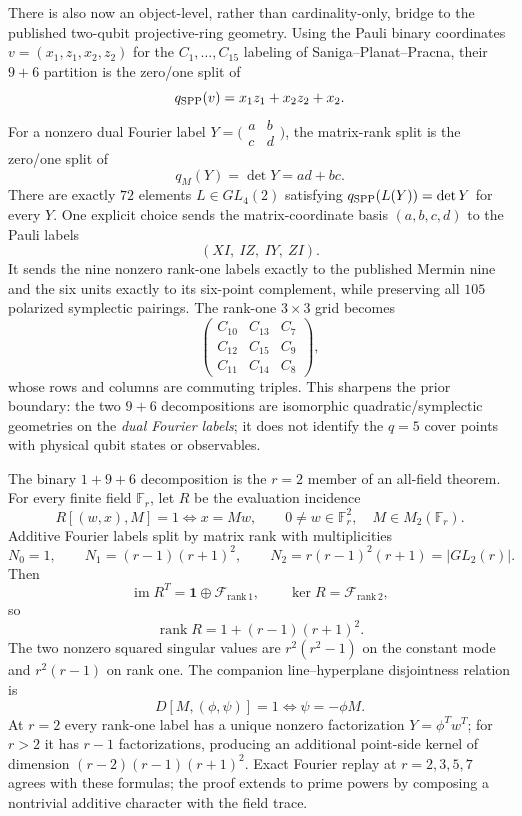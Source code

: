 There is also now an object-level, rather than cardinality-only, bridge to the
published two-qubit projective-ring geometry.  Using the Pauli binary coordinates
$v=(x_1,z_1,x_2,z_2)$ for the $C_1,\ldots,C_{15}$ labeling of
Saniga--Planat--Pracna, their $9+6$ partition is the zero/one split of
\[
q_{\rm SPP}(v)=x_1z_1+x_2z_2+x_2.
\]
For a nonzero dual Fourier label
$Y=\bigl(\begin{smallmatrix}a&b\\c&d\end{smallmatrix}\bigr)$, the matrix-rank
split is the zero/one split of
\[
q_M(Y)=\det Y=ad+bc.
\]
There are exactly $72$ elements $L\in GL_4(2)$ satisfying
$q_{\rm SPP}(L(Y))=\det Y$ for every $Y$.  One explicit choice sends the
matrix-coordinate basis $(a,b,c,d)$ to the Pauli labels
\[
(XI,\ IZ,\ IY,\ ZI).
\]
It sends the nine nonzero rank-one labels exactly to the published Mermin
nine and the six units exactly to its six-point complement, while preserving
all $105$ polarized symplectic pairings.  The rank-one $3\times3$ grid becomes
\[
\begin{pmatrix}
C_{10}&C_{13}&C_7\\
C_{12}&C_{15}&C_9\\
C_{11}&C_{14}&C_8
\end{pmatrix},
\]
whose rows and columns are commuting triples.  This sharpens the prior boundary:
the two $9+6$ decompositions are isomorphic quadratic/symplectic geometries on
the \emph{dual Fourier labels}; it does not identify the $q=5$ cover points with
physical qubit states or observables.

The binary $1+9+6$ decomposition is the $r=2$ member of an all-field theorem.
For every finite field $\mathbb F_r$, let $R$ be the evaluation incidence
\[
R[(w,x),M]=1\iff x=Mw,
\qquad 0\ne w\in\mathbb F_r^2,\quad M\in M_2(\mathbb F_r).
\]
Additive Fourier labels split by matrix rank with multiplicities
\[
N_0=1,\qquad N_1=(r-1)(r+1)^2,\qquad
N_2=r(r-1)^2(r+1)=|GL_2(r)|.
\]
Then
\[
\boxed{\operatorname{im}R^T=\mathbf 1\oplus\mathcal F_{\mathrm{rank}\,1}},
\qquad
\boxed{\ker R=\mathcal F_{\mathrm{rank}\,2}},
\]
so
\[
\boxed{\operatorname{rank}R=1+(r-1)(r+1)^2}.
\]
The two nonzero squared singular values are $r^2(r^2-1)$ on the constant mode
and $r^2(r-1)$ on rank one.  The companion line--hyperplane disjointness relation
is
\[
D[M,(\phi,\psi)]=1\iff \psi=-\phi M.
\]
At $r=2$ every rank-one label has a unique nonzero factorization
$Y=\phi^T w^T$; for $r>2$ it has $r-1$ factorizations, producing an additional
point-side kernel of dimension $(r-2)(r-1)(r+1)^2$.  Exact Fourier replay at
$r=2,3,5,7$ agrees with these formulas; the proof extends to prime powers by
composing a nontrivial additive character with the field trace.


